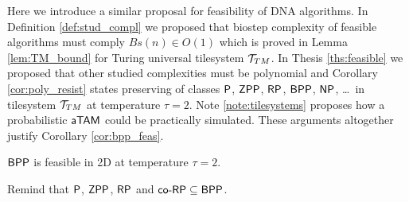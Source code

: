 	Here we introduce a similar proposal for feasibility of DNA algorithms. In Definition \ref{def:stud_compl} we proposed that biostep complexity of feasible algorithms must comply $Bs(n)\in O(1)$ which is proved in Lemma \ref{lem:TM_bound} for Turing universal tilesystem ${\cal T}_{TM}$. In Thesis \ref{ths:feasible} we proposed that other studied complexities must be polynomial and Corollary \ref{cor:poly_resist} states preserving of classes $\P$, $\ZPP$, $\RP$, $\BPP$, $\NP$, \ldots ~in tilesystem ${\cal T}_{TM}$ at temperature $\tau=2$. Note \ref{note:tilesystems} proposes how a probabilistic $\atam$ could be practically simulated. These arguments altogether justify Corollary \ref{cor:bpp_feas}.   %
	
	\begin{cor}
	\label{cor:bpp_feas}
		$\BPP$ is feasible in 2D at temperature $\tau=2$.
	\end{cor}
	
	\begin{note}
		Remind that $\P$, $\ZPP$, $\RP$ and $\coRP \subseteq \BPP$.
	\end{note}
	
	
	
	
	

